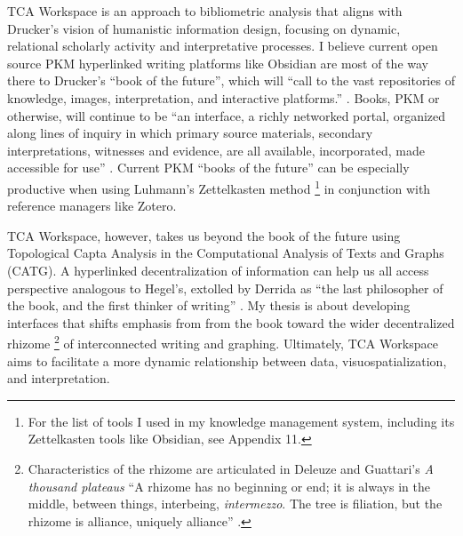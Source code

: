 TCA Workspace is an approach to bibliometric analysis that aligns with Drucker's vision of humanistic information design, focusing on dynamic, relational scholarly activity and interpretative processes. I believe current open source PKM hyperlinked writing platforms like Obsidian are most of the way there to Drucker’s “book of the future”, which will “call to the vast repositories of knowledge, images, interpretation, and interactive platforms.” \citep[p. 175]{drucker_graphesis_2014}. Books, PKM or otherwise, will continue to be “an interface, a richly networked portal, organized along lines of inquiry in which primary source materials, secondary interpretations, witnesses and evidence, are all available, incorporated, made accessible for use” \citep[p. 175]{drucker_graphesis_2014}. 
Current PKM “books of the future” can be especially productive when using Luhmann's Zettelkasten method \citep{luhmann_kommunikation_1981,cevolini_forgetting_2016,ahrens_how_2017}\footnote{For the list of tools I used in my knowledge management system, including its Zettelkasten tools like Obsidian, see Appendix 11.} in conjunction with reference managers like Zotero.


TCA Workspace, however, takes us beyond the book of the future using Topological Capta Analysis in the Computational Analysis of Texts and Graphs (CATG). A hyperlinked decentralization of information can help us all access perspective analogous to Hegel’s, extolled by Derrida as “the last philosopher of the book, and the first thinker of writing” \citep[p. 26]{derrida_grammatology_1997}. My thesis is about developing interfaces that shifts emphasis from from the book toward the wider decentralized rhizome \citep{deleuze_thousand_2007}\footnote{Characteristics of the rhizome are articulated in Deleuze and Guattari’s \textit{A thousand plateaus} “A rhizome has no beginning or end; it is always in the middle, between things, interbeing, \textit{intermezzo}. The tree is filiation, but the rhizome is alliance, uniquely alliance” \citep[p. 25]{deleuze_thousand_2007}.} of interconnected writing and graphing. Ultimately, TCA Workspace aims to facilitate a more dynamic relationship between data, visuospatialization, and interpretation. 
